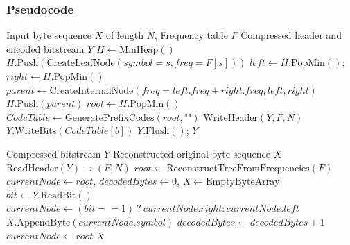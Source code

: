 \documentclass[12pt,a4paper]{article}
\begin{document}
\subsubsection{Pseudocode}
\begin{algorithm}[H]
\caption{Huffman Tree Construction and Bitstream Encoding}
\begin{algorithmic}[1]
\Require Input byte sequence $X$ of length $N$, Frequency table $F$
\Ensure Compressed header and encoded bitstream $Y$
\State $H \gets \text{MinHeap}()$
    \State $H.\text{Push}(\text{CreateLeafNode}(symbol = s, freq = F[s]))$
\EndFor
{}
    \State $left \gets H.\text{PopMin}()$; $right \gets H.\text{PopMin}()$
    \State $parent \gets \text{CreateInternalNode}(freq = left.freq + right.freq, left, right)$
    \State $H.\text{Push}(parent)$
\EndWhile
\State $root \gets H.\text{PopMin}()$
\State $CodeTable \gets \text{GeneratePrefixCodes}(root, \text{""})$
\State $\text{WriteHeader}(Y, F, N)$
    \State $Y.\text{WriteBits}(CodeTable[b])$
\EndFor
\State $Y.\text{Flush}()$; \Return $Y$
\end{algorithmic}
\end{algorithm}

\begin{algorithm}[H]
\caption{Huffman Bitstream Decoding}
\begin{algorithmic}[1]
\Require Compressed bitstream $Y$
\Ensure Reconstructed original byte sequence $X$
\State $\text{ReadHeader}(Y) \to (F, N)$
\State $root \gets \text{ReconstructTreeFromFrequencies}(F)$
\State $currentNode \gets root$, $decodedBytes \gets 0$, $X \gets \text{EmptyByteArray}$
    \State $bit \gets Y.\text{ReadBit}()$
    \State $currentNode \gets (bit == 1) \ ? \ currentNode.right : currentNode.left$
        \State $X.\text{AppendByte}(currentNode.symbol)$
        \State $decodedBytes \gets decodedBytes + 1$
        \State $currentNode \gets root$
    \EndIf
\EndWhile
\State \Return $X$
\end{algorithmic}
\end{algorithm}
\end{document}
